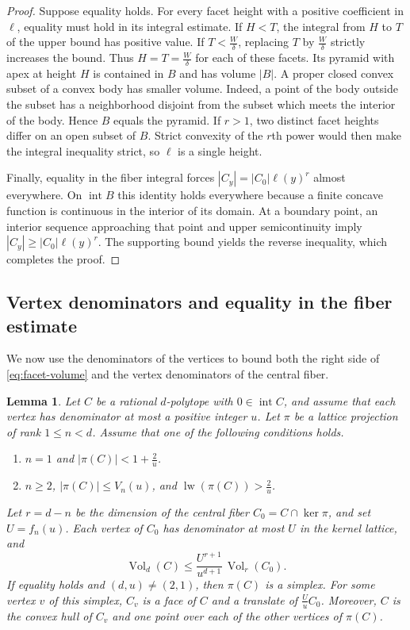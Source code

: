 \documentclass[reqno, 11pt]{article}
\numberwithin{equation}{section}
\newtheorem{lemma}[lemma]{Lemma}
\theoremstyle{definition}
\DeclareMathOperator{\Vol}{Vol}
\DeclareMathOperator{\lw}{lw}
\DeclareMathOperator{\intr}{int}
\begin{document}
\begin{proof}
Suppose equality holds. For every facet height with a positive
coefficient in $\ell$, equality must hold in its integral estimate.
If $H<T$, the integral from $H$ to $T$ of the upper bound has
positive value. If $T<\frac{W}{\delta}$, replacing $T$ by
$\frac{W}{\delta}$ strictly increases the bound. Thus
$H=T=\frac{W}{\delta}$ for each of these facets. Its pyramid with
apex at height $H$ is contained in $B$ and has volume $|B|$.
A proper closed convex subset of a convex body has smaller volume. Indeed, a point of the body outside the subset has a neighborhood disjoint
from the subset which meets the interior of the body. Hence $B$
equals the pyramid. If $r>1$, two distinct facet heights differ on an
open subset of $B$. Strict convexity of the $r$th power would then
make the integral inequality strict, so $\ell$ is a single height.

Finally, equality in the fiber integral forces
$|C_y|=|C_0|\ell(y)^r$ almost everywhere. On $\intr B$ this identity
holds everywhere because a finite concave function is continuous in
the interior of its domain. At a boundary point, an interior sequence
approaching that point and upper semicontinuity imply
$|C_y|\ge |C_0|\ell(y)^r$. The supporting bound yields the reverse
inequality, which completes the proof.
\end{proof}

\subsection{Vertex denominators and equality in the fiber estimate}

We now use the denominators of the vertices to bound both the right
side of \eqref{eq:facet-volume} and the vertex denominators of the central fiber.

\begin{lemma}\label{lem:reduction}
Let $C$ be a rational $d$-polytope with $0\in\intr C$, and assume that
each vertex has denominator at most a positive integer $u$. Let $\pi$
be a lattice projection of rank $1\le n<d$. Assume that one of the
following conditions holds.
\begin{enumerate}
\item $n=1$ and $|\pi(C)|<1+\frac{2}{u}$.
\item $n\ge2$, $|\pi(C)|\le V_n(u)$, and $\lw(\pi(C))>\frac{2}{u}$.
\end{enumerate}
Let $r=d-n$ be the dimension of the central fiber $C_0=C\cap\ker\pi$,
and set $U=f_n(u)$. Each vertex of $C_0$ has denominator at most $U$
in the kernel lattice, and
\begin{equation}\label{eq:one-lift}
            \Vol_d(C)\le \frac{U^{r+1}}{u^{d+1}}\,\Vol_r(C_0).
\end{equation}
If equality holds and $(d,u)\ne(2,1)$, then $\pi(C)$ is a simplex.
For some vertex $v$ of this simplex, $C_v$ is a face of $C$ and a
translate of $\frac{U}{u}C_0$. Moreover, $C$ is the convex hull of $C_v$ and
one point over each of the other vertices of $\pi(C)$.
\end{lemma}
\end{document}
